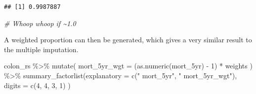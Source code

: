 \documentclass[
]{book}
\newenvironment{Shaded}{\begin{snugshade}}{\end{snugshade}}
\newcommand{\AttributeTok}[1]{\textcolor[rgb]{0.77,0.63,0.00}{#1}}
\newcommand{\CommentTok}[1]{\textcolor[rgb]{0.56,0.35,0.01}{\textit{#1}}}
\newcommand{\DecValTok}[1]{\textcolor[rgb]{0.00,0.00,0.81}{#1}}
\newcommand{\FunctionTok}[1]{\textcolor[rgb]{0.00,0.00,0.00}{#1}}
\newcommand{\NormalTok}[1]{#1}
\newcommand{\OtherTok}[1]{\textcolor[rgb]{0.56,0.35,0.01}{#1}}
\newcommand{\SpecialCharTok}[1]{\textcolor[rgb]{0.00,0.00,0.00}{#1}}
\newcommand{\StringTok}[1]{\textcolor[rgb]{0.31,0.60,0.02}{#1}}
\begin{document}
\begin{Shaded}
\end{Shaded}

\begin{verbatim}
## [1] 0.9987887
\end{verbatim}

\begin{Shaded}
\begin{Highlighting}[]
\CommentTok{\# Whoop whoop if \textasciitilde{}1.0}
\end{Highlighting}
\end{Shaded}

A weighted proportion can then be generated, which gives a very similar result to the multiple imputation.

\begin{Shaded}
\begin{Highlighting}[]
\NormalTok{colon\_rs }\SpecialCharTok{\%\textgreater{}\%}  
  \FunctionTok{mutate}\NormalTok{(}
    \AttributeTok{mort\_5yr\_wgt =}\NormalTok{ (}\FunctionTok{as.numeric}\NormalTok{(mort\_5yr) }\SpecialCharTok{{-}} \DecValTok{1}\NormalTok{) }\SpecialCharTok{*}\NormalTok{ weights}
\NormalTok{  ) }\SpecialCharTok{\%\textgreater{}\%} 
  \FunctionTok{summary\_factorlist}\NormalTok{(}\AttributeTok{explanatory =} \FunctionTok{c}\NormalTok{(}\StringTok{" mort\_5yr"}\NormalTok{, }\StringTok{" mort\_5yr\_wgt"}\NormalTok{), }\AttributeTok{digits =} \FunctionTok{c}\NormalTok{(}\DecValTok{4}\NormalTok{, }\DecValTok{4}\NormalTok{, }\DecValTok{3}\NormalTok{, }\DecValTok{1}\NormalTok{) )}
\end{Highlighting}
\end{Shaded}
\end{document}
